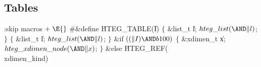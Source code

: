 \subsection{Tables}
\noindent
\Y\B\4:skip macros\X${}\mathrel+\E{}$\6
\8\#\&{define} \.{HTEG\_TABLE}(\|I)\1\1\2\2\1\6
\4${}\{{}$\5
\&{list\_t} \|l;\5
${}\index{hteg list+\\{hteg\_list}}\\{hteg\_list}({\AND}\|l){}$;\5
${}\}{}$\2\1\7
\4${}\{{}$\5
\&{list\_t} \|l;\5
${}\index{hteg list+\\{hteg\_list}}\\{hteg\_list}({\AND}\|l){}$;\5
${}\}{}$\2\6
\&{if} ${}((\|I)\AND\\{b100}){}$\5
\1${}\{{}$\5
\&{xdimen\_t} \|x;\5
${}\index{hteg xdimen node+\\{hteg\_xdimen\_node}}\\{hteg\_xdimen\_node}({\AND}\|x){}$;\5
${}\}{}$\2\6
\&{else}\1\5
\.{HTEG\_REF}(\\{xdimen\_kind})\2
\Y
\fi



